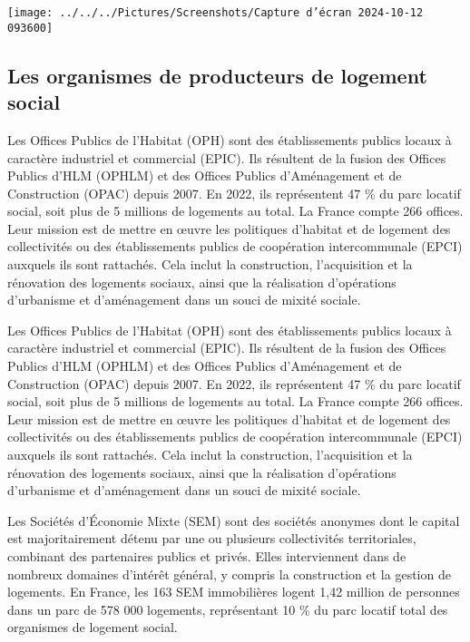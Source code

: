 \documentclass[a4paper, 12pt]{report}
\begin{document}
\begin{center}
	\texttt{[image: ../../../Pictures/Screenshots/Capture d'écran 2024-10-12 093600]}
\end{center}

\subsection{Les organismes de producteurs de logement social}

Les Offices Publics de l’Habitat (OPH) sont des établissements publics locaux à caractère industriel et commercial (EPIC). Ils résultent de la fusion des Offices Publics d’HLM (OPHLM) et des Offices Publics d’Aménagement et de Construction (OPAC) depuis 2007. En 2022, ils représentent 47 \% du parc locatif social, soit plus de 5 millions de logements au total. La France compte 266 offices. Leur mission est de mettre en œuvre les politiques d’habitat et de logement des collectivités ou des établissements publics de coopération intercommunale (EPCI) auxquels ils sont rattachés. Cela inclut la construction, l’acquisition et la rénovation des logements sociaux, ainsi que la réalisation d’opérations d’urbanisme et d’aménagement dans un souci de mixité sociale.

Les Offices Publics de l’Habitat (OPH) sont des établissements publics locaux à caractère industriel et commercial (EPIC). Ils résultent de la fusion des Offices Publics d’HLM (OPHLM) et des Offices Publics d’Aménagement et de Construction (OPAC) depuis 2007. En 2022, ils représentent 47 \% du parc locatif social, soit plus de 5 millions de logements au total. La France compte 266 offices. Leur mission est de mettre en œuvre les politiques d’habitat et de logement des collectivités ou des établissements publics de coopération intercommunale (EPCI) auxquels ils sont rattachés. Cela inclut la construction, l’acquisition et la rénovation des logements sociaux, ainsi que la réalisation d’opérations d’urbanisme et d’aménagement dans un souci de mixité sociale.

Les Sociétés d’Économie Mixte (SEM) sont des sociétés anonymes dont le capital est majoritairement détenu par une ou plusieurs collectivités territoriales, combinant des partenaires publics et privés. Elles interviennent dans de nombreux domaines d’intérêt général, y compris la construction et la gestion de logements. En France, les 163 SEM immobilières logent 1,42 million de personnes dans un parc de 578 000 logements, représentant 10 \% du parc locatif total des organismes de logement social.
\end{document}
